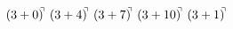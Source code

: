 \documentclass[preview]{standalone}
\begin{document}
\begin{align*}
(3+0)^{\hspace{-0.1cm}\urcorner} \ (3+4)^{\hspace{-0.1cm}\urcorner} \ (3+7)^{\hspace{-0.1cm}\urcorner} \ (3+10)^{\hspace{-0.1cm}\urcorner} \ (3+1)^{\hspace{-0.1cm}\urcorner}
\end{align*}
\end{document}

